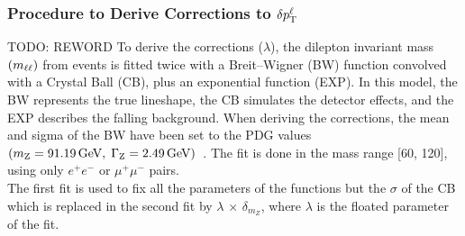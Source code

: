 \subsubsection{Procedure to Derive Corrections to $\delta p_{\mathrm{T}}^{\ell}$}
TODO: REWORD
To derive the corrections ($\lambda$), the dilepton invariant mass $\left( m_{\ell\ell} \right)$ from \ztolplm events is fitted twice with a Breit--Wigner (BW) function convolved with a Crystal Ball (CB), plus an exponential function (EXP).
In this model, the BW represents the true \mZ lineshape, the CB simulates the detector effects, and the EXP describes the falling background.
When deriving the corrections, the mean and sigma of the BW have been set to the PDG values $\left( m_{\mathrm{Z}} = 91.19\,\text{Ge\hspace{-.08em}V}, \; \Gamma_{\mathrm{Z}} = 2.49\,\text{Ge\hspace{-.08em}V} \right)$~\cite{particle_data_group_review_2020}.
 The fit is done in the mass range [60, 120]\GeV, using only
$e^{+}e^{-}$ or $\mu^{+}\mu^{-}$ pairs.\\
The first fit is used to fix all the parameters of the functions but the $\sigma$ of the CB which is
replaced in the second fit by $\lambda$ $\times$ $\delta_{m_{Z}}$, where $\lambda$ is the 
floated parameter of the fit. 


